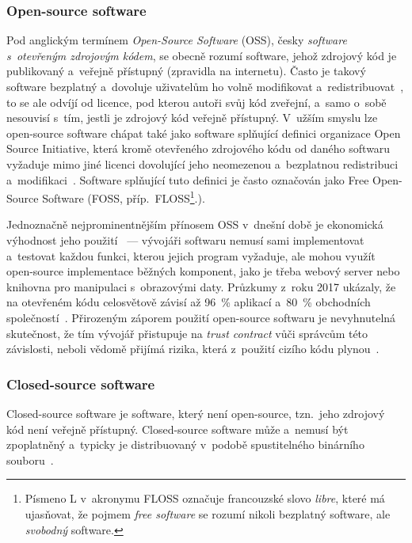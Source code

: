 \subsubsection*{Open-source software}

Pod anglickým termínem \emph{Open-Source Software} (OSS), česky \emph{software s~otevřeným zdrojovým kódem}, se obecně rozumí software, jehož zdrojový kód je publikovaný a~veřejně přístupný (zpravidla na internetu). Často je takový software bezplatný a~dovoluje uživatelům ho volně modifikovat a~redistribuovat~\cite{schryen2009security}, to se ale odvíjí od licence, pod kterou autoři svůj kód zveřejní, a~samo o~sobě nesouvisí s~tím, jestli je zdrojový kód veřejně přístupný. V~užším smyslu lze open-source software chápat také jako software splňující definici organizace Open Source Initiative, která kromě otevřeného zdrojového kódu od daného softwaru vyžaduje mimo jiné licenci dovolující jeho neomezenou a~bezplatnou redistribuci a~modifikaci~\cite{osidefinition}. Software splňující tuto definici je často označován jako Free Open-Source Software (FOSS, příp.\ FLOSS\footnote{Písmeno L v~akronymu FLOSS označuje francouzské slovo \textit{libre}, které má ujasňovat, že pojmem \emph{free software} se rozumí nikoli bezplatný software, ale \emph{svobodný} software.}.).

Jednoznačně nejprominentnějším přínosem OSS v~dnešní době je ekonomická výhodnost jeho použití~\cite{boughton2024decomposing} --- vývojáři softwaru nemusí sami implementovat a~testovat každou funkci, kterou jejich program vyžaduje, ale mohou využít open-source implementace běžných komponent, jako je třeba webový server nebo knihovna pro manipulaci s~obrazovými daty. Průzkumy z~roku 2017 ukázaly, že na otevřeném kódu celosvětově závisí až 96~\% aplikací a~80~\% obchodních společností~\cite{wen2019security}. Přirozeným záporem použití open-source softwaru je nevyhnutelná skutečnost, že tím vývojář přistupuje na \emph{trust contract} vůči správcům této závislosti, neboli vědomě přijímá rizika, která z~použití cizího kódu plynou~\cite{boughton2024decomposing}.

\subsubsection*{Closed-source software}

Closed-source software je software, který není open-source, tzn.\ jeho zdrojový kód není veřejně přístupný. Closed-source software může a~nemusí být zpoplatněný a~typicky je distribuovaný v~podobě spustitelného binárního souboru~\cite{schryen2009security}.

